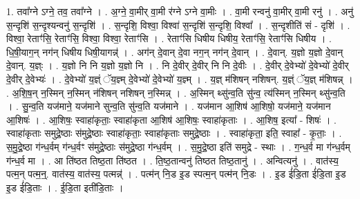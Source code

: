 \documentclass[17pt]{extarticle}
\begin{document}
1. तवा᳚ग्ने ऽग्ने॒ तव॒ तवा᳚ग्ने । . अ॒ग्ने॒ वा॒मीर् वा॒मी र॑ग्ने ऽग्ने वा॒मीः । . वा॒मी रन्वनु॑ वा॒मीर् वा॒मी रनु॑ । . अनु॑ स॒न्दृशि॑ स॒न्दृश्यन्वनु॑ स॒न्दृशि॑ । . स॒न्दृशि॒ विश्वा॒ विश्वा॑ स॒न्दृशि॑ स॒न्दृशि॒ विश्वा᳚ । . स॒न्दृशीति॑ सं - दृशि॑ । . विश्वा॒ रेताꣳ॑सि॒ रेताꣳ॑सि॒ विश्वा॒ विश्वा॒ रेताꣳ॑सि । . रेताꣳ॑सि धिषीय धिषीय॒ रेताꣳ॑सि॒ रेताꣳ॑सि धिषीय । . धि॒षी॒याग॒न् नग॑न् धिषीय धिषी॒यागन्न्॑ । . अग॑न् दे॒वान् दे॒वा नग॒न् नग॑न् दे॒वान् । . दे॒वान्. य॒ज्ञो य॒ज्ञो दे॒वान् दे॒वान्. य॒ज्ञ्ः । . य॒ज्ञो नि नि य॒ज्ञो य॒ज्ञो नि । . नि दे॒वीर् दे॒वीर् नि नि दे॒वीः । . दे॒वीर् दे॒वेभ्यो॑ दे॒वेभ्यो॑ दे॒वीर् दे॒वीर् दे॒वेभ्यः॑ । . दे॒वेभ्यो॑ य॒ज्ञ्ं ॅय॒ज्ञ्म् दे॒वेभ्यो॑ दे॒वेभ्यो॑ य॒ज्ञ्म् । . य॒ज्ञ् म॑शिषन् नशिषन्. य॒ज्ञ्ं ॅय॒ज्ञ् म॑शिषन्न् । . अ॒शि॒ष॒न् न॒स्मिन् न॒स्मिन् न॑शिषन् नशिषन् न॒स्मिन्न् । . अ॒स्मिन् थ्सु॑न्व॒ति सु॑न्व॒ त्य॑स्मिन् न॒स्मिन् थ्सु॑न्व॒ति । . सु॒न्व॒ति यज॑माने॒ यज॑माने सुन्व॒ति सु॑न्व॒ति यज॑माने । . यज॑मान आ॒शिष॑ आ॒शिषो॒ यज॑माने॒ यज॑मान आ॒शिषः॑ । . आ॒शिषः॒ स्वाहा॑कृताः॒ स्वाहा॑कृता आ॒शिष॑ आ॒शिषः॒ स्वाहा॑कृताः । . आ॒शिष॒ इत्या᳚ - शिषः॑ । . स्वाहा॑कृताः समुद्रे॒ष्ठाः स॑मुद्रे॒ष्ठाः स्वाहा॑कृताः॒ स्वाहा॑कृताः समुद्रे॒ष्ठाः । . स्वाहा॑कृता॒ इति॒ स्वाहा᳚ - कृ॒ताः॒ । . स॒मु॒द्रे॒ष्ठा ग॑न्ध॒र्वम् ग॑न्ध॒र्वꣳ स॑मुद्रे॒ष्ठाः स॑मुद्रे॒ष्ठा ग॑न्ध॒र्वम् । . स॒मु॒द्रे॒ष्ठा इति॑ समुद्रे - स्थाः । . ग॒न्ध॒र्व मा ग॑न्ध॒र्वम् ग॑न्ध॒र्व मा । . आ ति॑ष्ठत तिष्ठ॒ता ति॑ष्ठत । . ति॒ष्ठ॒तान्वनु॑ तिष्ठत तिष्ठ॒तानु॑ । . अन्वित्यनु॑ । . वात॑स्य॒ पत्म॒न् पत्म॒न्॒. वात॑स्य॒ वात॑स्य॒ पत्मन्न्॑ । . पत्म॑न् नि॒ड इ॒ड स्पत्म॒न् पत्म॑न् नि॒डः । . इ॒ड ई॑डि॒ता ई॑डि॒ता इ॒ड इ॒ड ई॑डि॒ताः । . ई॒डि॒ता इती॑डि॒ताः । \newline
\end{document}

